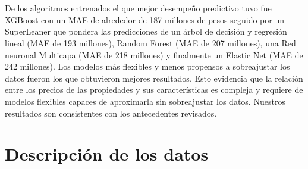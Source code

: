\documentclass[article,11 pt]{article}
\begin{document}
\\
\\
De los algoritmos entrenados el que mejor desempeño predictivo tuvo fue XGBoost con un MAE de alrededor de 187 millones de pesos seguido por un SuperLeaner que pondera las predicciones de un árbol de decisión y regresión lineal (MAE de 193 millones), Random Forest (MAE de 207 millones), una Red neuronal Multicapa (MAE de 218 millones) y finalmente un Elastic Net (MAE de 242 millones). Los modelos más flexibles y menos propensos a sobreajustar los datos fueron los que obtuvieron mejores resultados. Esto evidencia que la relación entre los precios de las propiedades y sus características es compleja y requiere de modelos flexibles capaces de aproximarla sin sobreajustar los datos. Nuestros resultados son consistentes con los antecedentes revisados. 



\section{Descripción de los datos}
\end{document}
